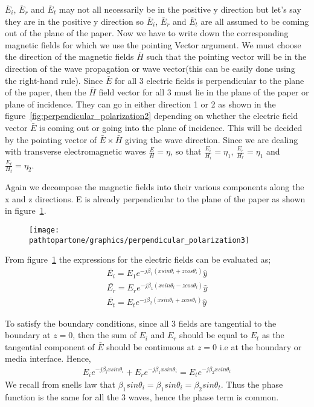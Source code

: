 $\bar{E}_{i}$, $\bar{E}_{r}$ and  $\bar{E}_{t}$ may not all necessarily be in the positive y direction but let's say they are in the positive y direction so  $\bar{E}_{i}$,  $\bar{E}_{r}$ and  $\bar{E}_{t}$ are all assumed to be coming out of the plane of the paper. Now we have to write down the corresponding magnetic fields for which we use the pointing Vector argument. We must choose the direction of the magnetic fields $\bar{H}$ such that the pointing vector will be in the direction of the wave propagation or wave vector(this can be easily done using the right-hand rule). Since $\bar{E}$ for all 3 electric fields is perpendicular to the plane of the paper, then the $\bar{H}$ field vector for all 3 must lie in the plane of the paper or plane of incidence. They can go in either direction 1 or 2 as shown in the figure~\ref{fig:perpendicular_polarization2} depending on whether the electric field vector $\bar{E}$ is coming out or going into the plane of incidence. This will be decided by the pointing vector of  $\bar{E} \times \bar{H}$ giving the wave direction. Since we are dealing with transverse electromagnetic waves $\frac{E}{H} = \eta$, so that $\frac{E_{i}}{H_{i}} = \eta_{1}$, $\frac{E_{r}}{H_{r}} = \eta_{1}$ and  $\frac{E_{t}}{H_{t}} = \eta_{2}$.

Again we decompose the magnetic fields into their various components along the x and z directions. E is already perpendicular to the plane of the paper as shown in figure~\ref{fig:14}.
\begin{figure}[h]
\centering
\texttt{[image: \\pathtopartone/graphics/perpendicular\_polarization3]}
\caption{}
\label{fig:14}
\end{figure}

From figure~\ref{fig:14} the expressions for the electric fields can be evaluated as;
\begin{align*}
\bar{E_{i}} = E_{1} e^{-j\beta_{1} (x sin\theta_{i} + z cos\theta_{i})} \hat{y}\\
\bar{E_{r}} = E_{r} e^{-j\beta_{1} (x sin\theta_{i} - z cos\theta_{i})} \hat{y}\\
\bar{E_{t}} = E_{t} e^{-j\beta_{2} (x sin\theta_{t} + z cos\theta_{t})} \hat{y}
\end{align*}

To satisfy the boundary conditions, since all 3 fields are tangential to the boundary at $z=0$, then the sum of $E_i$ and $E_r$ should be equal to $E_{t}$ as the tangential component of $\bar{E}$ should be continuous at $z=0$ i.e at the boundary or media interface.
Hence,
\begin{align*}
E_{i} e^{-j \beta_{i} x sin\theta_{i}} + E_{r} e^{-j \beta_{1} x sin\theta_{i}} = E_{t} e^{-j \beta_{2} x sin\theta_{t}}
\end{align*}
We recall from snells law that $\beta_{1} sin\theta_{i} = \beta_{1} sin\theta_{i} = \beta_{2} sin\theta_{t}$. Thus the phase function is the same for all the 3 waves, hence the phase term is common.

